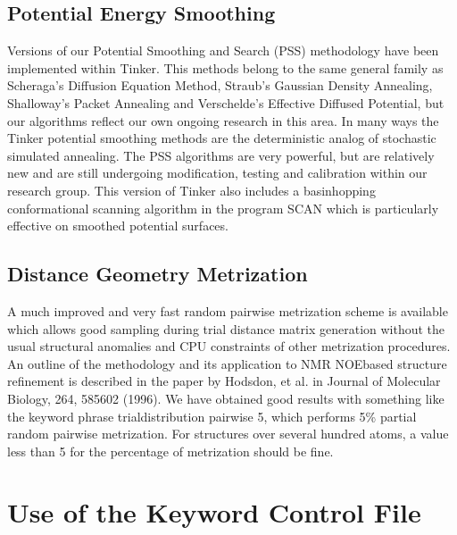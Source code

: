\documentclass[letterpaper,11pt,english]{sphinxmanual}
\begin{document}
\section{Potential Energy Smoothing}
\label{\detokenize{text/special-features:potential-energy-smoothing}}
\sphinxAtStartPar
Versions of our Potential Smoothing and Search (PSS) methodology have been implemented within Tinker. This methods belong to the same general family as Scheraga’s Diffusion Equation Method, Straub’s Gaussian Density Annealing, Shalloway’s Packet Annealing and Verschelde’s Effective Diffused Potential, but our algorithms reflect our own ongoing research in this area. In many ways the Tinker potential smoothing methods are the deterministic analog of stochastic simulated annealing. The PSS algorithms are very powerful, but are relatively new and are still undergoing modification, testing and calibration within our research group. This version of Tinker also includes a basin\sphinxhyphen{}hopping conformational scanning algorithm in the program SCAN which is particularly effective on smoothed potential surfaces.


\section{Distance Geometry Metrization}
\label{\detokenize{text/special-features:distance-geometry-metrization}}
\sphinxAtStartPar
A much improved and very fast random pairwise metrization scheme is available which allows good sampling during trial distance matrix generation without the usual structural anomalies and CPU constraints of other metrization procedures. An outline of the methodology and its application to NMR NOE\sphinxhyphen{}based structure refinement is described in the paper by Hodsdon, et al. in Journal of Molecular Biology, 264, 585\sphinxhyphen{}602 (1996). We have obtained good results with something like the keyword phrase trial\sphinxhyphen{}distribution pairwise 5, which performs 5\% partial random pairwise metrization. For structures over several hundred atoms, a value less than 5 for the percentage of metrization should be fine.

\sphinxstepscope


\chapter{Use of the Keyword Control File}
\label{\detokenize{text/keywords:use-of-the-keyword-control-file}}\label{\detokenize{text/keywords::doc}}
\end{document}

